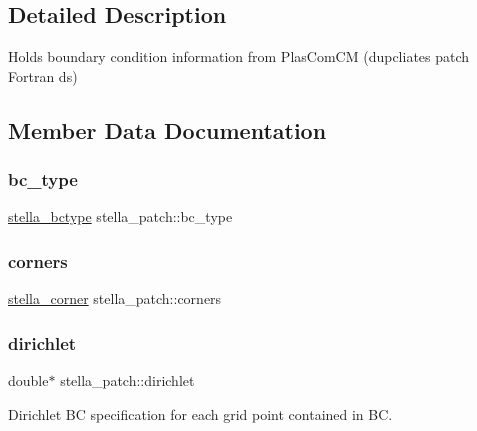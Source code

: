 \subsection{Detailed Description}
Holds boundary condition information from Plas\+Com\+CM (dupcliates patch Fortran ds) 

\subsection{Member Data Documentation}
\mbox{\label{structstella__patch_a78d598141e7d9910347ec3a2df8728f9}} 
\subsubsection{\texorpdfstring{bc\+\_\+type}{bc\_type}}
{\footnotesize\ttfamily \mbox{\hyperlink{stella__bc_8h_a7959afa0ee9aae02dd31cfce273269ce}{stella\+\_\+bctype}} stella\+\_\+patch\+::bc\+\_\+type}

\mbox{\label{structstella__patch_a1ec928943533a75b00a4a9f6d971e27f}} 
\subsubsection{\texorpdfstring{corners}{corners}}
{\footnotesize\ttfamily \mbox{\hyperlink{structstella__corner}{stella\+\_\+corner}} stella\+\_\+patch\+::corners}

\mbox{\label{structstella__patch_a59abdfc4d88960997cbcef83708fc856}} 
\subsubsection{\texorpdfstring{dirichlet}{dirichlet}}
{\footnotesize\ttfamily double$\ast$ stella\+\_\+patch\+::dirichlet}



Dirichlet BC specification for each grid point contained in BC. 

\mbox{\label{structstella__patch_a37a6c777f399d723635457e2c8b43d05}} 
